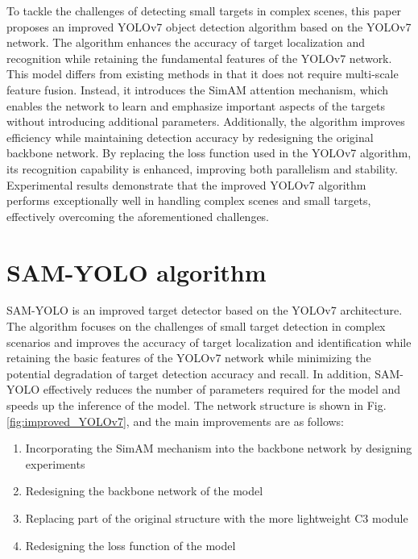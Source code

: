 \documentclass[aic]{iosart2x}
\begin{document}
To tackle the challenges of detecting small targets in complex scenes, this paper proposes an improved YOLOv7 object detection algorithm based on the YOLOv7 network. The algorithm enhances the accuracy of target localization and recognition while retaining the fundamental features of the YOLOv7 network. This model differs from existing methods in that it does not require multi-scale feature fusion. Instead, it introduces the SimAM attention mechanism, which enables the network to learn and emphasize important aspects of the targets without introducing additional parameters. Additionally, the algorithm improves efficiency while maintaining detection accuracy by redesigning the original backbone network. By replacing the loss function used in the YOLOv7 algorithm, its recognition capability is enhanced, improving both parallelism and stability. Experimental results demonstrate that the improved YOLOv7 algorithm performs exceptionally well in handling complex scenes and small targets, effectively overcoming the aforementioned challenges.

\section{SAM-YOLO algorithm} \label{sec:improved_algorithm}

SAM-YOLO is an improved target detector based on the YOLOv7 architecture. The algorithm focuses on the challenges of small target detection in complex scenarios and improves the accuracy of target localization and identification while retaining the basic features of the YOLOv7 network while minimizing the potential degradation of target detection accuracy and recall. In addition, SAM-YOLO effectively reduces the number of parameters required for the model and speeds up the inference of the model. The network structure is shown in Fig. \ref{fig:improved_YOLOv7}, and the main improvements are as follows:

\begin{enumerate}
    \item Incorporating the SimAM mechanism into the backbone network by designing experiments
    \item Redesigning the backbone network of the model
    \item Replacing part of the original structure with the more lightweight C3 module
    \item Redesigning the loss function of the model
\end{enumerate}
\end{document}
